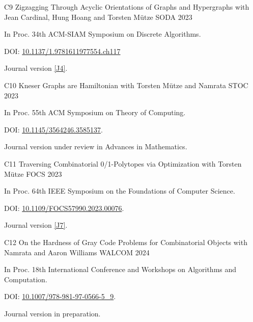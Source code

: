 \begin{cvpublications}
  \cvpublication
  {C9}
  {Zigzagging Through Acyclic Orientations of Graphs and Hypergraphs} %
  {with Jean Cardinal, Hung Hoang and Torsten Mütze} %
  {SODA} %
  {2023}
  {
  \begin{cvitems} %
    \item In Proc. 34th ACM-SIAM Symposium on Discrete Algorithms.
    \item[] DOI: \href{https://doi.org/10.1137/1.9781611977554.ch117}{10.1137/1.9781611977554.ch117}
    \item Journal version \hyperlink{paperJ4}{[J4]}.
  \end{cvitems}
  }
  \cvpublication
  {C10} %
  {Kneser Graphs are Hamiltonian} %
  {with Torsten Mütze and Namrata} %
  {STOC} %
  {2023}
  {
  \begin{cvitems} %
    \item In Proc. 55th ACM Symposium on Theory of Computing.
    \item[] DOI: \href{https://doi.org/10.1145/3564246.3585137}{10.1145/3564246.3585137}.
    \item Journal version under review in Advances in Mathematics.
  \end{cvitems}
  }
  
  \cvpublication
  {C11} %
  {Traversing Combinatorial 0/1-Polytopes via Optimization} %
  {with Torsten Mütze} %
  {FOCS} %
  {2023}
  {
  \begin{cvitems} %
    \item In Proc. 64th IEEE Symposium on the Foundations of Computer Science.
    \item[] DOI: \href{https://doi.org/10.1109/FOCS57990.2023.00076}{10.1109/FOCS57990.2023.00076}.
    \item Journal version \hyperlink{paperJ7}{[J7]}.
  \end{cvitems}
  }
  \cvpublication
  {C12} %
  {On the Hardness of Gray Code Problems for Combinatorial Objects} %
  {with Namrata and Aaron Williams} %
  {WALCOM} %
  {2024}
  {
  \begin{cvitems} %
    \item In Proc. 18th International Conference and Workshops on Algorithms and Computation.
    \item[] DOI: \href{https://doi.org/10.1007/978-981-97-0566-5\_9}{10.1007/978-981-97-0566-5\_9}.
    \item Journal version in preparation.
  \end{cvitems}
  }


\end{cvpublications}
